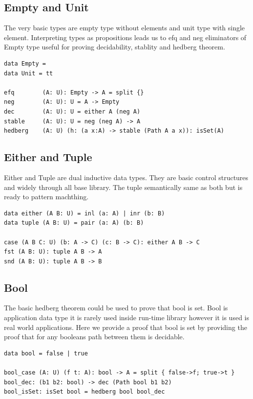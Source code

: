 \documentclass{article}
\begin{document}
\subsection{Empty and Unit}

The very basic types are empty type without elements and unit type with single element.
Interpreting types as propositions leads us to efq and neg eliminators of Empty type useful
for proving decidability, stablity and hedberg theorem.

\begin{lstlisting}[mathescape=true]
data Empty =
data Unit = tt

efq        (A: U): Empty -> A = split {}
neg        (A: U): U = A -> Empty
dec        (A: U): U = either A (neg A)
stable     (A: U): U = neg (neg A) -> A
hedberg    (A: U) (h: (a x:A) -> stable (Path A a x)): isSet(A)
\end{lstlisting}

\subsection{Either and Tuple}

Either and Tuple are dual inductive data types.
They are  basic control structures and widely through all base library.
The tuple semantically same as both but is ready to pattern machthing.

\begin{lstlisting}[mathescape=true]
data either (A B: U) = inl (a: A) | inr (b: B)
data tuple (A B: U) = pair (a: A) (b: B)

case (A B C: U) (b: A -> C) (c: B -> C): either A B -> C
fst (A B: U): tuple A B -> A
snd (A B: U): tuple A B -> B
\end{lstlisting}

\subsection{Bool}

The basic hedberg theorem could be used to prove that bool is set.
Bool is application data type it is rarely used inside run-time library
however it is used is real world applications. Here we provide a proof
that bool is set by providing the proof that for any booleans path
between them is decidable.

\begin{lstlisting}[mathescape=true]
data bool = false | true

bool_case (A: U) (f t: A): bool -> A = split { false->f; true->t }
bool_dec: (b1 b2: bool) -> dec (Path bool b1 b2)
bool_isSet: isSet bool = hedberg bool bool_dec
\end{lstlisting}
\end{document}
